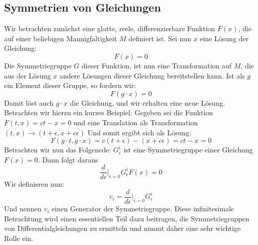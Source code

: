 \documentclass[a4paper]{article}
\begin{document}
\subsection{Symmetrien von Gleichungen}
Wir betrachten zunächst eine glatte, reele, differenzierbare Funktion $F(x)$, die auf einer beliebigen Mannigfaltigkeit $M$ definiert ist. Sei nun $x$ eine Lösung der Gleichung:
\begin{equation}
F(x)=0
\end{equation}
Die Symmetriegruppe $G$ dieser Funktion, ist nun eine Transformation auf $M$, die aus der Lösung $x$ andere Lösungen dieser Gleichung bereitstellen kann. Ist als $g$ ein Element dieser Gruppe, so fordern wir:
\begin{equation}
    F(g\cdot x)=0
\end{equation}
Damit löst auch $g\cdot x$ die Gleichung, und wir erhalten eine neue Lösung. Betrachten wir hierzu ein kurzes Beispiel: Gegeben sei die Funktion $F(t,x)=ct-x=0$ und eine Translation als Transformation $(t,x)\rightarrow (t+\epsilon,x+c\epsilon)$
Und somit ergibt sich als Lösung:
\begin{equation}
    F(g\cdot t,g\cdot x)=c(t+\epsilon)-(x+c\epsilon)=ct-x=0
\end{equation}
\newline
Betrachten wir nun das Folgenede: $G^i_\epsilon$ ist eine Symmetriegruppe einer Gleichung $F(x)=0$. Dann folgt daraus
\begin{equation}
    \frac{d}{d\epsilon}\biggl|_{\epsilon=0}G^i_\epsilon F(x)=0
\end{equation}
Wir definieren nun:
\begin{equation}
    v_i=\frac{d}{d\epsilon}\biggl|_{\epsilon=0}G^i_\epsilon
\end{equation}
Und nennen $v_i$ einen Generator der Symmetriegruppe.
Diese infinitesimale Betrachtung wird einen essentiellen Teil dazu beitragen, die Symmetriegruppen von Differentialgleichungen zu ermitteln und nimmt daher eine sehr wichtige Rolle ein.
\end{document}
